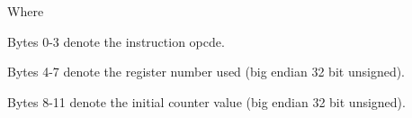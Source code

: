 Where

Bytes 0-3 denote the instruction opcde.

Bytes 4-7 denote the register number used
(big endian 32 bit unsigned).

Bytes 8-11 denote the initial counter value
(big endian 32 bit unsigned).
